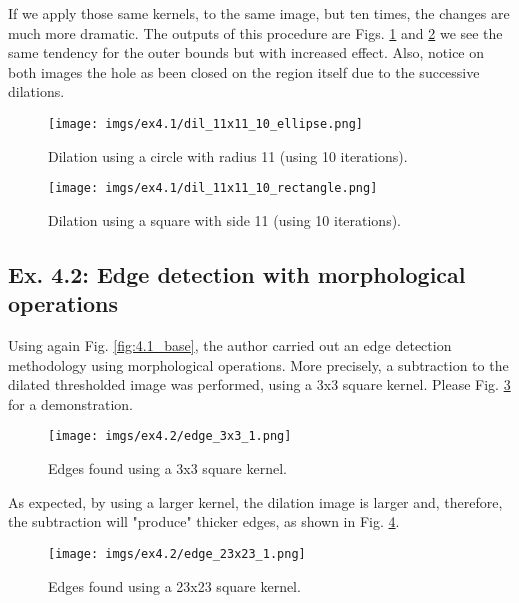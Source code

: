 \documentclass[journal]{IEEEtran}
\begin{document}
If we apply those same kernels, to the same image, but ten times, the changes are much more dramatic. The outputs of this procedure are Figs. \ref{fig:4.1_dil_11x11_10_ellipse} and \ref{fig:4.1_dil_11x11_10_rectangle} we see the same tendency for the outer bounds but with increased effect. Also, notice on both images the hole as been closed on the region itself due to the successive dilations.

\begin{figure}[htp]
  \centering
  \texttt{[image: imgs/ex4.1/dil\_11x11\_10\_ellipse.png]}
  \caption{Dilation using a circle with radius 11 (using 10 iterations).}
  \label{fig:4.1_dil_11x11_10_ellipse}
\end{figure}
\FloatBarrier

\begin{figure}[htp]
  \centering
  \texttt{[image: imgs/ex4.1/dil\_11x11\_10\_rectangle.png]}
  \caption{Dilation using a square with side 11 (using 10 iterations).}
  \label{fig:4.1_dil_11x11_10_rectangle}
\end{figure}
\FloatBarrier

\subsection{Ex. 4.2: Edge detection with morphological operations}

Using again Fig. \ref{fig:4.1_base}, the author carried out an edge detection methodology using morphological operations. More precisely, a subtraction to the dilated thresholded image was performed, using a 3x3 square kernel. Please Fig. \ref{fig:4.2_edges_3x3_1} for a demonstration.

\begin{figure}[htp]
  \centering
  \texttt{[image: imgs/ex4.2/edge\_3x3\_1.png]}
  \caption{Edges found using a 3x3 square kernel.}
  \label{fig:4.2_edges_3x3_1}
\end{figure}
\FloatBarrier

As expected, by using a larger kernel, the dilation image is larger and, therefore, the subtraction will "produce" thicker edges, as shown in Fig. \ref{fig:4.2_edges_23x23_1}.

\begin{figure}[htp]
  \centering
  \texttt{[image: imgs/ex4.2/edge\_23x23\_1.png]}
  \caption{Edges found using a 23x23 square kernel.}
  \label{fig:4.2_edges_23x23_1}
\end{figure}
\FloatBarrier
\end{document}
